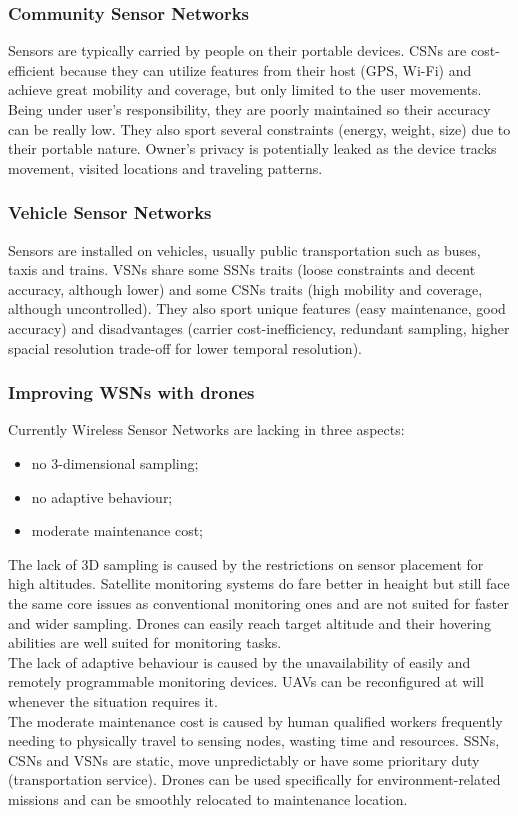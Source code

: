\documentclass[journal]{IEEEtran}
\begin{document}
\subsubsection{Community Sensor Networks}
Sensors are typically carried by people on their portable devices. CSNs are cost-efficient because they can utilize features from their host (GPS, Wi-Fi) and achieve great mobility and coverage, but only limited to the user movements. Being under user's responsibility, they are poorly maintained so their accuracy can be really low. They also sport several constraints (energy, weight, size) due to their portable nature. Owner's privacy is potentially leaked as the device tracks movement, visited locations and traveling patterns.

\subsubsection{Vehicle Sensor Networks}
Sensors are installed on vehicles, usually public transportation such as buses, taxis and trains. VSNs share some SSNs traits (loose constraints and decent accuracy, although lower) and some CSNs traits (high mobility and coverage, although uncontrolled). They also sport unique features (easy maintenance, good accuracy) and disadvantages (carrier cost-inefficiency, redundant sampling, higher spacial resolution trade-off for lower temporal resolution).

\subsubsection{Improving WSNs with drones}
Currently Wireless Sensor Networks are lacking in three aspects:
\begin{itemize}
	\item no 3-dimensional sampling;
    \item no adaptive behaviour;
    \item moderate maintenance cost;
\end{itemize}
The lack of 3D sampling is caused by the restrictions on sensor placement for high altitudes. Satellite monitoring systems do fare better in heaight but still face the same core issues as conventional monitoring ones and are not suited for faster and wider sampling. Drones can easily reach target altitude and their hovering abilities are well suited for monitoring tasks.
\\
The lack of adaptive behaviour is caused by the unavailability of easily and remotely programmable monitoring devices. UAVs can be reconfigured at will whenever the situation requires it.
\\
The moderate maintenance cost is caused by human qualified workers frequently needing to physically travel to sensing nodes, wasting time and resources. SSNs, CSNs and VSNs are static, move unpredictably or have some prioritary duty (transportation service). Drones can be used specifically for environment-related missions and can be smoothly relocated to maintenance location.
\end{document}

